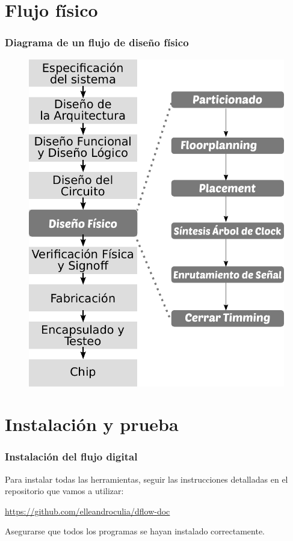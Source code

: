 \documentclass{beamer}
\begin{document}
\section{Flujo físico}
\begin{frame}
  \frametitle{Diagrama de un flujo de diseño físico}

 \begin{figure}[h]
 \centering
 \includegraphics[scale=0.40]{figuras/DisenioFisico.pdf}
 \end{figure}

\end{frame}
\section{Instalación y prueba}
\begin{frame}
  \frametitle{Instalación del flujo digital}
  Para instalar todas las herramientas, seguir las instrucciones detalladas en el repositorio que vamos a utilizar:

  \url{https://github.com/elleandroculia/dflow-doc}

  Asegurarse que todos los programas se hayan instalado correctamente.
\end{frame}
\end{document}
